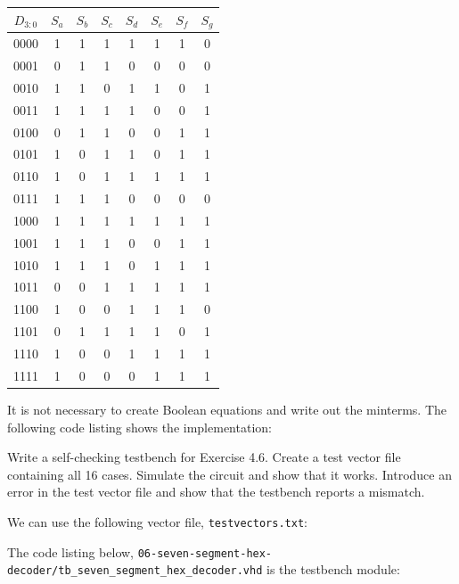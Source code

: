 \documentclass[12pt]{article}
\newenvironment{ex}[2][Exercise]{\begin{trivlist}
		\item[\hskip \labelsep {\bfseries #1}\hskip \labelsep {\bfseries #2.}]}{\end{trivlist}}
\newenvironment{sol}[1][Solution]{\begin{trivlist}
		\item[\hskip \labelsep {\bfseries #1:}]}{\end{trivlist}}
\begin{document}
\begin{sol}
\begin{center}
\begin{tabular}{c|ccccccc}
			$D_{3:0}$ & $S_a$ & $S_b$ & $S_c$ & $S_d$ & $S_e$ & $S_f$ & $S_g$\\
			\hline
			0000 & 1 & 1 & 1 & 1 & 1 & 1 & 0\\
			0001 & 0 & 1 & 1 & 0 & 0 & 0 & 0\\
			0010 & 1 & 1 & 0 & 1 & 1 & 0 & 1\\
			0011 & 1 & 1 & 1 & 1 & 0 & 0 & 1\\
			0100 & 0 & 1 & 1 & 0 & 0 & 1 & 1\\
			0101 & 1 & 0 & 1 & 1 & 0 & 1 & 1\\
			0110 & 1 & 0 & 1 & 1 & 1 & 1 & 1\\
			0111 & 1 & 1 & 1 & 0 & 0 & 0 & 0\\
			1000 & 1 & 1 & 1 & 1 & 1 & 1 & 1\\
			1001 & 1 & 1 & 1 & 0 & 0 & 1 & 1\\
			1010 & 1 & 1 & 1 & 0 & 1 & 1 & 1\\
			1011 & 0 & 0 & 1 & 1 & 1 & 1 & 1\\
			1100 & 1 & 0 & 0 & 1 & 1 & 1 & 0\\
			1101 & 0 & 1 & 1 & 1 & 1 & 0 & 1\\
			1110 & 1 & 0 & 0 & 1 & 1 & 1 & 1\\
			1111 & 1 & 0 & 0 & 0 & 1 & 1 & 1\\
		\end{tabular}
	\end{center}
	It is not necessary to create Boolean equations and write out the minterms. The following
	code listing shows the implementation:
	
\end{sol}

\begin{ex}{4.7}
	Write a self-checking testbench for Exercise 4.6. Create a test vector file containing all
	16 cases. Simulate the circuit and show that it works. Introduce an error in the test vector
	file and show that the testbench reports a mismatch.
\end{ex}

\begin{sol}
	We can use the following vector file, \texttt{testvectors.txt}:
	
	The code listing below, \texttt{06-seven-segment-hex-decoder/tb\_seven\_segment\_hex\_decoder.vhd} is the testbench module:
	
\end{sol}
\end{document}
